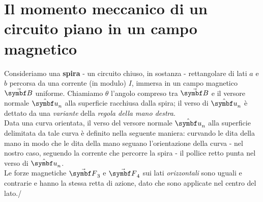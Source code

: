 \section{Il momento meccanico di un circuito piano in un campo magnetico}\label{spirarettangolaremeccanica}
Consideriamo una \textbf{spira} - un circuito chiuso, in sostanza - rettangolare di lati $a$ e $b$ percorsa da una corrente (in modulo) $I$, immersa in un campo magnetico $\vba{B}$ uniforme. Chiamiamo $\theta$ l'angolo compreso tra $\vba{B}$ e il versore normale $\vbh{u}_n$ alla superficie racchiusa dalla spira; il verso di $\vbh{u}_n$ è dettato da una \textit{variante} della \textit{regola della mano destra}.\\
Data una curva orientata, il verso del versore normale $\vbh{u}_n$ alla superficie delimitata da tale curva è definito nella seguente maniera: curvando le dita della mano in modo che le dita della mano seguano l'orientazione della curva - nel nostro caso, seguendo la corrente che percorre la spira - il pollice retto punta nel verso di $\vbh{u}_n$.\\
Le forze magnetiche $\vba{F}_3$ e $\vba{F}_4$ sui lati \textit{orizzontali} sono uguali e contrarie e hanno la stessa retta di azione, dato che sono applicate nel centro del lato./
